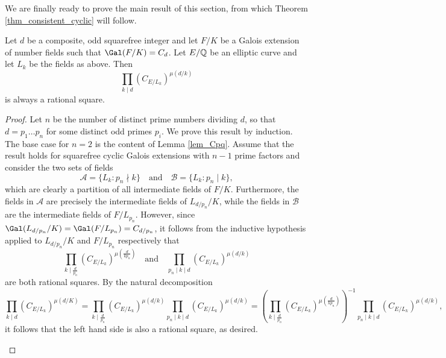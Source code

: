 We are finally ready to prove the main result of this section, from which Theorem \ref{thm_consistent_cyclic} will follow. 

\begin{lemma}\label{lem_Cd_odd}
    Let $d$ be a composite, odd squarefree integer and let $F/K$ be a Galois extension of number fields such that $\Gal(F/K)=C_{d}$. Let $E/\mathbb{Q}$ be an elliptic curve and let $L_k$ be the fields as above. Then
    $$\prod_{k\mid d}(C_{E/L_k})^{\mu(d/k)}$$
    is always a rational square.
\end{lemma}

\begin{proof}
    Let $n$ be the number of distinct prime numbers dividing $d$, so that $d=p_1\ldots p_n$ for some distinct odd primes $p_i$. We prove this result by induction. The base case for $n=2$ is the content of Lemma \ref{lem_Cpq}. Assume that the result holds for squarefree cyclic Galois extensions with $n-1$ prime factors and consider the two sets of fields
    $$\mathcal{A}=\{L_k:p_n\nmid k\}\quad\text{and}\quad\mathcal{B}=\{L_k:p_n\mid k\},$$
    which are clearly a partition of all intermediate fields of $F/K$. Furthermore, the fields in $\mathcal{A}$ are precisely the intermediate fields of $L_{d/p_n}/K$, while the fields in $\mathcal{B}$ are the intermediate fields of $F/L_{p_n}$. However, since $\Gal(L_{d/p_n}/K)=\Gal(F/L_{p_n})=C_{d/p_n}$, it follows from the inductive hypothesis applied to $L_{d/p_n}/K$ and $F/L_{p_n}$ respectively that
    $$\prod_{k\mid \frac{d}{p_n}}(C_{E/L_k})^{\mu\left(\frac{d}{kp_n}\right)}\quad\text{and}\quad\prod_{p_n\mid k\mid d}(C_{E/L_{k}})^{\mu\left(d/k\right)}$$
    are both rational squares. By the natural decomposition
    $$\prod_{k\mid d}(C_{E/L_k})^{\mu(d/K)}=\prod_{k\mid \frac{d}{p_n}}(C_{E/L_k})^{\mu\left(d/k\right)}\prod_{p_n\mid k\mid d}(C_{E/L_{k}})^{\mu\left(d/k\right)}=\left(\prod_{k\mid \frac{d}{p_n}}(C_{E/L_k})^{\mu\left(\frac{d}{kp_n}\right)}\right)^{-1}\prod_{p_n\mid k\mid d}(C_{E/L_{k}})^{\mu\left(d/k\right)},$$
    it follows that the left hand side is also a rational square, as desired.
    \begin{figure}[!ht]
        \centering
\end{figure}
\end{proof}
